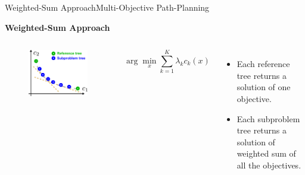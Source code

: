 \begin{frame}{Weighted-Sum Approach}{Multi-Objective Path-Planning}

	{\bf Weighted-Sum Approach}
	
	\begin{columns}
		\begin{figure}[t]
			\centering
			\includegraphics[width=\linewidth]{figure/MORRF_weighted_sum}
		\end{figure}
		
        \begin{block}{}
		\begin{equation}
		\nonumber
		\arg\min_x \sum_{k=1}^{K} \lambda_{k} c_{k} (x)
		\end{equation}
		\end{block}

		
		\footnotesize{
			\begin{itemize}
			    \item Each reference tree returns a solution of one objective.
				\item Each subproblem tree returns a solution of weighted sum of all the objectives.
			\end{itemize}
		}
	\end{columns}
	
\end{frame}

